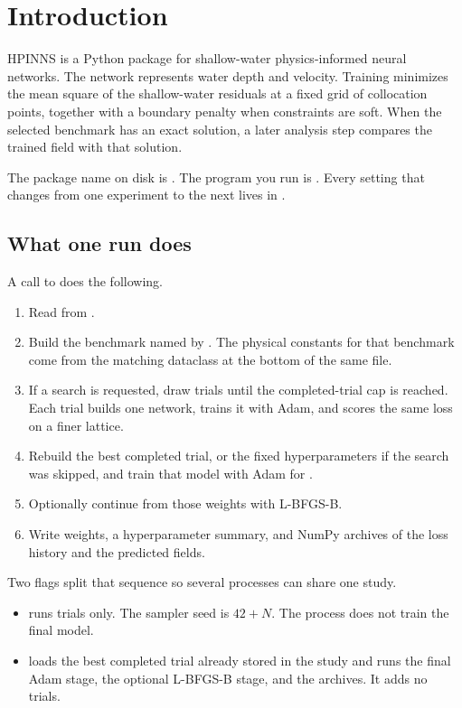 \chapter{Introduction}
\label{ch:intro}

HPINNS is a Python package for shallow-water physics-informed neural networks.
The network represents water depth and velocity.
Training minimizes the mean square of the shallow-water residuals at a fixed grid of collocation points, together with a boundary penalty when constraints are soft.
When the selected benchmark has an exact solution, a later analysis step compares the trained field with that solution.

The package name on disk is .
The program you run is .
Every setting that changes from one experiment to the next lives in .

\section{What one run does}

A call to  does the following.

\begin{enumerate}
\item Read  from .
\item Build the benchmark named by .
  The physical constants for that benchmark come from the matching dataclass at the bottom of the same file.
\item If a search is requested, draw trials until the completed-trial cap is reached.
  Each trial builds one network, trains it with Adam, and scores the same loss on a finer lattice.
\item Rebuild the best completed trial, or the fixed hyperparameters if the search was skipped, and train that model with Adam for .
\item Optionally continue from those weights with L-BFGS-B.
\item Write weights, a hyperparameter summary, and NumPy archives of the loss history and the predicted fields.
\end{enumerate}

Two flags split that sequence so several processes can share one study.

\begin{itemize}
\item {} runs trials only.
  The sampler seed is \(42+N\).
  The process does not train the final model.
\item {} loads the best completed trial already stored in the study and runs the final Adam stage, the optional L-BFGS-B stage, and the archives.
  It adds no trials.
\end{itemize}

